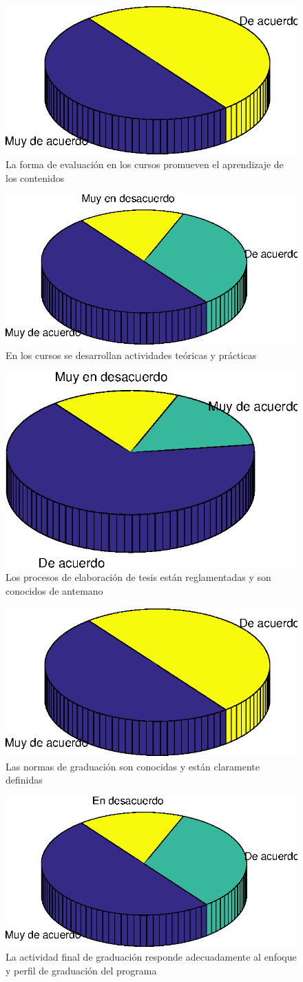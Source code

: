 \begin{figure}[ht]
\centering
\includegraphics[width=0.5\columnwidth]{./figure/graph20.eps}
\caption{La forma de evaluación en los cursos promueven el aprendizaje de los contenidos}
\label{graph20}
\end{figure}

\begin{figure}[ht]
\centering
\includegraphics[width=0.5\columnwidth]{./figure/graph21.eps}
\caption{En los cursos se desarrollan actividades teóricas y prácticas}
\label{graph21}
\end{figure}

\begin{figure}[ht]
\centering
\includegraphics[width=0.5\columnwidth]{./figure/graph22.eps}
\caption{Los procesos de elaboración de tesis están reglamentadas y son conocidos de antemano}
\label{graph22}
\end{figure}

\begin{figure}[ht]
\centering
\includegraphics[width=0.5\columnwidth]{./figure/graph23.eps}
\caption{Las normas de graduación son conocidas y están claramente definidas}
\label{graph23}
\end{figure}

\begin{figure}[ht]
\centering
\includegraphics[width=0.5\columnwidth]{./figure/graph24.eps}
\caption{La actividad final de graduación responde adecuadamente al enfoque y perfil de graduación del programa}
\label{graph24}
\end{figure}

